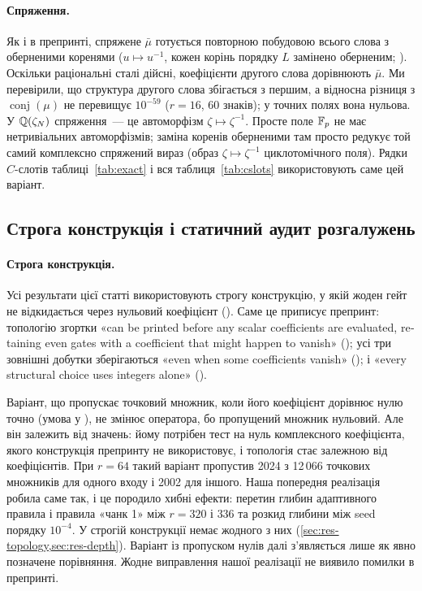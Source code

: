 \documentclass[11pt]{article}
\theoremstyle{plain}
\newcommand{\en}[1]{\foreignlanguage{english}{#1}}
\begin{document}
\paragraph{Спряження.}
Як і в препринті, спряжене $\bar\mu$ готується повторною побудовою всього слова з оберненими коренями ($u\mapsto u^{-1}$, кожен корінь порядку $L$ замінено оберненим; ). Оскільки раціональні сталі дійсні, коефіцієнти другого слова дорівнюють $\bar\mu$. Ми перевірили, що структура другого слова збігається з першим, а відносна різниця з $\operatorname{conj}(\mu)$ не перевищує $10^{-59}$ ($r=16$, 60 знаків); у точних полях вона нульова. У $\mathbb{Q}(\zeta_N)$ спряження~--- це автоморфізм $\zeta\mapsto\zeta^{-1}$. Просте поле $\mathbb{F}_p$ не має нетривіальних автоморфізмів; заміна коренів оберненими там просто редукує той самий комплексно спряжений вираз (образ $\zeta\mapsto\zeta^{-1}$ циклотомічного поля). Рядки $C$-слотів таблиці~\ref{tab:exact} і вся таблиця~\ref{tab:cslots} використовують саме цей варіант.

\subsection{Строга конструкція і статичний аудит розгалужень}\label{sec:strict}
\paragraph{Строга конструкція.}
Усі результати цієї статті використовують строгу конструкцію, у якій жоден гейт не відкидається через нульовий коефіцієнт (). Саме це приписує препринт: топологію згортки «\en{can be printed before any scalar coefficients are evaluated, retaining even gates with a coefficient that might happen to vanish}» (); усі три зовнішні добутки зберігаються «\en{even when some coefficients vanish}» (); і «\en{every structural choice uses integers alone}» ().

Варіант, що пропускає точковий множник, коли його коефіцієнт дорівнює нулю точно (умова  у ), не змінює оператора, бо пропущений множник нульовий. Але він залежить від значень: йому потрібен тест на нуль комплексного коефіцієнта, якого конструкція препринту не використовує, і топологія стає залежною від коефіцієнтів. При $r=64$ такий варіант пропустив 2024 з 12\,066 точкових множників для одного входу і 2002 для іншого. Наша попередня реалізація робила саме так, і це породило хибні ефекти: перетин глибин адаптивного правила і правила «чанк 1» між $r=320$ і $336$ та розкид глибини між seed порядку $10^{-4}$. У строгій конструкції немає жодного з них (\cref{sec:res-topology,sec:res-depth}). Варіант із пропуском нулів далі з'являється лише як явно позначене порівняння. Жодне виправлення нашої реалізації не виявило помилки в препринті.
\end{document}
